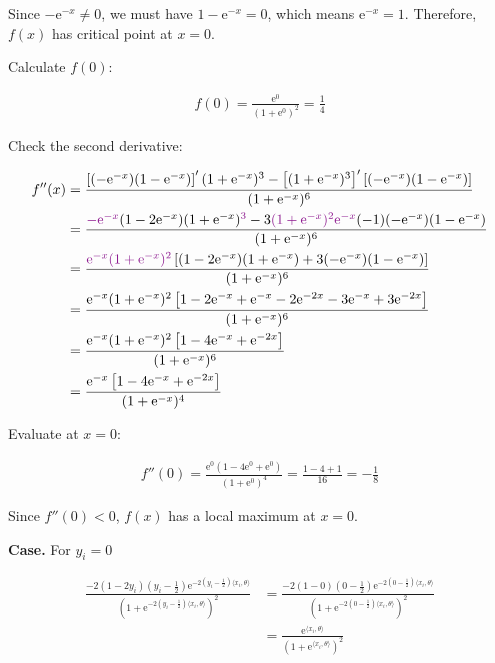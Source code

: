 \documentclass{article}
\begin{document}
Since $-\mathrm{e}^{-x} \ne 0$, we must have $1 - \mathrm{e}^{-x} = 0$, which means $\mathrm{e}^{-x} = 1$.
Therefore, $f(x)$ has critical point at $x = 0$.

Calculate $f(0)$:

\begin{align*}
    f(0) = \frac{\mathrm{e}^{0}}{(1 +\mathrm{e}^{0})^2} = \frac{1}{4}
\end{align*}

Check the second derivative:
\bigskip

\begin{align*}
    f''(x) 
    &= \frac{\left[(-\mathrm{e}^{-x})(1 - \mathrm{e}^{-x}) \right]'(1 +\mathrm{e}^{-x})^3 - \left[ (1 +\mathrm{e}^{-x})^3 \right]'\left[(-\mathrm{e}^{-x})(1 - \mathrm{e}^{-x}) \right]}{(1 +\mathrm{e}^{-x})^6} \\
    &= \frac{\textcolor{Plum}{-\mathrm{e}^{-x}} (1 - 2\mathrm{e}^{-x})(1 +\mathrm{e}^{-x})\textcolor{Plum}{^3} - 3\textcolor{Plum}{(1 +\mathrm{e}^{-x})^2 \mathrm{e}^{-x}} (-1) (-\mathrm{e}^{-x})(1 - \mathrm{e}^{-x})}{(1 +\mathrm{e}^{-x})^6} \\
    &= \frac{\textcolor{Plum}{\mathrm{e}^{-x} (1 +\mathrm{e}^{-x})^2} \left[ (1 - 2\mathrm{e}^{-x})(1 +\mathrm{e}^{-x}) + 3 (-\mathrm{e}^{-x}) (1 - \mathrm{e}^{-x}) \right]}{(1 +\mathrm{e}^{-x})^6} \\
    &= \frac{\mathrm{e}^{-x} (1 +\mathrm{e}^{-x})^2 \left[ 1 - 2\mathrm{e}^{-x} + \mathrm{e}^{-x} - 2 \mathrm{e}^{-2x} - 3 \mathrm{e}^{-x} + 3 \mathrm{e}^{-2x} \right]}{(1 +\mathrm{e}^{-x})^6} \\
    &= \frac{\mathrm{e}^{-x} (1 +\mathrm{e}^{-x})^2 \left[ 1 - 4\mathrm{e}^{-x} + \mathrm{e}^{-2x} \right]}{(1 +\mathrm{e}^{-x})^6} \\
    &= \frac{\mathrm{e}^{-x} \left[ 1 - 4\mathrm{e}^{-x} + \mathrm{e}^{-2x} \right]}{(1 +\mathrm{e}^{-x})^4}
\end{align*}

Evaluate at $x = 0$:

\begin{align*}
    f''(0) = \frac{\mathrm{e}^0 (1 - 4\mathrm{e}^0 + \mathrm{e}^{0})}{(1 + \mathrm{e}^0)^4} = \frac{1 - 4 + 1}{16} = -\frac{1}{8}
\end{align*}

Since $f''(0) < 0$, $f(x)$ has a local maximum at $x = 0$.
\bigskip

\textbf{Case.} For \( y_i = 0 \)

\begin{align*}
    \frac{-2(1 - 2y_i)(y_i - \frac{1}{2})\mathrm{e}^{-2(y_i - \frac{1}{2})\langle x_i, \theta \rangle}}{(1 +\mathrm{e}^{-2(y_i - \frac{1}{2})\langle x_i, \theta \rangle})^2}
    &= \frac{-2(1 - 0)(0 - \frac{1}{2})\mathrm{e}^{-2(0 - \frac{1}{2})\langle x_i, \theta \rangle}}{(1 +\mathrm{e}^{-2(0 - \frac{1}{2})\langle x_i, \theta \rangle})^2} \\
    &= \frac{\mathrm{e}^{\langle x_i, \theta \rangle}}{(1 +\mathrm{e}^{\langle x_i, \theta \rangle})^2}
\end{align*}
\end{document}
